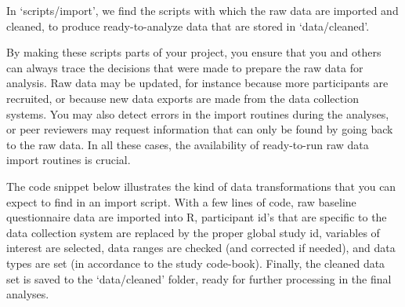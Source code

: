 \documentclass[]{book}
\begin{document}
In `scripts/import', we find the scripts with which the raw data are
imported and cleaned, to produce ready-to-analyze data that are stored
in `data/cleaned'.

By making these scripts parts of your project, you ensure that you and
others can always trace the decisions that were made to prepare the raw
data for analysis. Raw data may be updated, for instance because more
participants are recruited, or because new data exports are made from
the data collection systems. You may also detect errors in the import
routines during the analyses, or peer reviewers may request information
that can only be found by going back to the raw data. In all these
cases, the availability of ready-to-run raw data import routines is
crucial.

The code snippet below illustrates the kind of data transformations that
you can expect to find in an import script. With a few lines of code,
raw baseline questionnaire data are imported into R, participant id's
that are specific to the data collection system are replaced by the
proper global study id, variables of interest are selected, data ranges
are checked (and corrected if needed), and data types are set (in
accordance to the study code-book). Finally, the cleaned data set is
saved to the `data/cleaned' folder, ready for further processing in the
final analyses.
\end{document}
